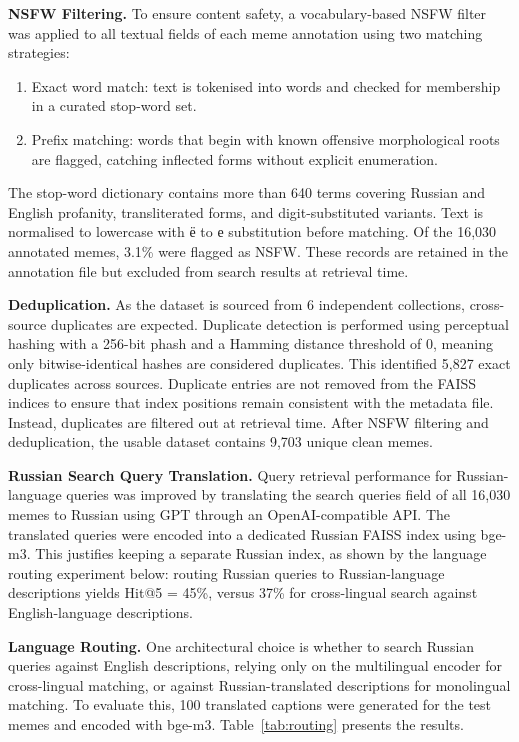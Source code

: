 \documentclass[a4paper,12pt]{article}
\begin{document}
\textbf{NSFW Filtering.} To ensure content safety, a vocabulary-based NSFW filter was applied to all textual fields of each meme annotation using two matching strategies:

\begin{enumerate}
    \item Exact word match: text is tokenised into words and checked for membership in a curated stop-word set.
    \item Prefix matching: words that begin with known offensive morphological roots are flagged, catching inflected forms without explicit enumeration.
\end{enumerate}

The stop-word dictionary contains more than 640 terms covering Russian and English profanity, transliterated forms, and digit-substituted variants. Text is normalised to lowercase with \foreignlanguage{russian}{ё} to е substitution before matching. Of the 16,030 annotated memes, 3.1\% were flagged as NSFW. These records are retained in the annotation file but excluded from search results at retrieval time.

\textbf{Deduplication.} As the dataset is sourced from 6 independent collections, cross-source duplicates are expected. Duplicate detection is performed using perceptual hashing with a 256-bit phash and a Hamming distance threshold of 0, meaning only bitwise-identical hashes are considered duplicates. This identified 5,827 exact duplicates across sources. Duplicate entries are not removed from the FAISS indices to ensure that index positions remain consistent with the metadata file. Instead, duplicates are filtered out at retrieval time. After NSFW filtering and deduplication, the usable dataset contains 9,703 unique clean memes.

\textbf{Russian Search Query Translation.} Query retrieval performance for Russian-language queries was improved by translating the search queries field of all 16,030 memes to Russian using GPT through an OpenAI-compatible API. The translated queries were encoded into a dedicated Russian FAISS index using bge-m3. This justifies keeping a separate Russian index, as shown by the language routing experiment below: routing Russian queries to Russian-language descriptions yields Hit@5 = 45\%, versus 37\% for cross-lingual search against English-language descriptions.

\textbf{Language Routing.}
\label{sec:lang_exp}
One architectural choice is whether to search Russian queries against English descriptions, relying only on the multilingual encoder for cross-lingual matching, or against Russian-translated descriptions for monolingual matching. To evaluate this, 100 translated captions were generated for the test memes and encoded with bge-m3. Table~\ref{tab:routing} presents the results.
\end{document}

